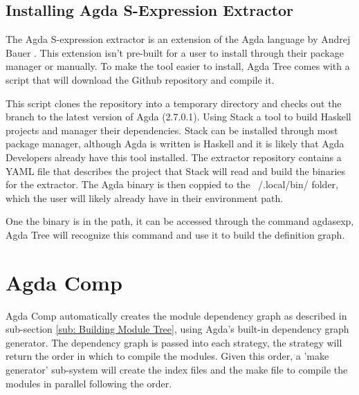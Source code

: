 \subsection{Installing Agda S-Expression Extractor}

The Agda S-expression extractor is an extension of the Agda language by Andrej
Bauer \cite{andrej}. This extension isn't pre-built for a user to install
through their package manager or manually. To make the tool easier to install,
Agda Tree comes with a script that will download the Github repository and
compile it. 

This script clones the repository into a temporary directory and checks out the
branch to the latest version of Agda (2.7.0.1). Using Stack a tool to build
Haskell projects and manager their dependencies. Stack can be installed through
most package manager, although Agda is written is Haskell and it is likely that
Agda Developers already have this tool installed. The extractor repository
contains a YAML file that describes the project that Stack will read and build
the binaries for the extractor. The Agda binary is then coppied to the
\textsf{~/.local/bin/} folder, which the user will likely already have in their
environment path. 

One the binary is in the path, it can be accessed through the command
\textsf{agdasexp}, Agda Tree will recognize this command and use it to build
the definition graph.


\section{Agda Comp}

Agda Comp automatically creates the module dependency graph as described in
sub-section \ref{sub: Building Module Tree}, using Agda's built-in dependency
graph generator. The dependency graph is passed into each strategy, the
strategy will return the order in which to compile the modules. Given this
order, a 'make generator' sub-system will create the index files and the make
file to compile the modules in parallel following the order.

